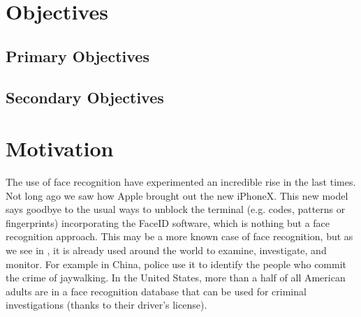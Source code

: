 \section{Objectives}
	\subsection{Primary Objectives}
	\subsection{Secondary Objectives}

\section{Motivation}
The use of face recognition have experimented an incredible rise in the last times. Not long ago we saw how Apple brought out the new iPhoneX. This new model says goodbye to the usual ways to unblock the terminal (e.g. codes, patterns or fingerprints) incorporating the FaceID software, which is nothing but a face recognition approach. This may be a more known case of face recognition, but as we see in \cite{iphonex_and_other_uses}, it is already used around the world to examine, investigate, and monitor. For example in China, police use it to identify the people who commit the crime of jaywalking. In the United States, more than a half of all American adults are in a face recognition database that can be used for criminal investigations (thanks to their driver’s license).





